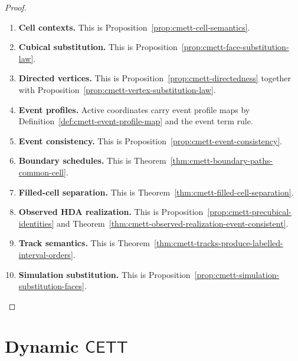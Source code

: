 \begin{proof}
    \leavevmode
    \begin{enumerate}
        \item \textbf{Cell contexts.}
        This is Proposition~\ref{prop:cmett-cell-semantics}.

        \item \textbf{Cubical substitution.}
        This is Proposition~\ref{prop:cmett-face-substitution-law}.

        \item \textbf{Directed vertices.}
        This is Proposition~\ref{prop:cmett-directedness} together with
        Proposition~\ref{prop:cmett-vertex-substitution-law}.

        \item \textbf{Event profiles.}
        Active coordinates carry event profile maps by
        Definition~\ref{def:cmett-event-profile-map} and the event term rule.

        \item \textbf{Event consistency.}
        This is Proposition~\ref{prop:cmett-event-consistency}.

        \item \textbf{Boundary schedules.}
        This is Theorem~\ref{thm:cmett-boundary-paths-common-cell}.

        \item \textbf{Filled-cell separation.}
        This is Theorem~\ref{thm:cmett-filled-cell-separation}.

        \item \textbf{Observed HDA realization.}
        This is Proposition~\ref{prop:cmett-precubical-identities} and
        Theorem~\ref{thm:cmett-observed-realization-event-consistent}.

        \item \textbf{Track semantics.}
        This is Theorem~\ref{thm:cmett-tracks-produce-labelled-interval-orders}.

        \item \textbf{Simulation substitution.}
        This is Proposition~\ref{prop:cmett-simulation-substitution-faces}.
    \end{enumerate}
\end{proof}

\section{\texorpdfstring{Dynamic \(\mathsf{CETT}\)}{}}
\label{sec:cmett-dynamic-cett}

